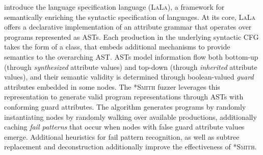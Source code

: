 \citet{kreutzer2020language} introduce the language specification language
(\textsc{LaLa}), a framework for semantically enriching the syntactic
specification of languages.
At its core, \textsc{LaLa} offers a declarative implementation of an
attribute grammar that operates over programs represented as \gls{AST}s.
Each production in the underlying syntactic \gls{CFG} takes the form of a
class, that embeds additional mechanisms to provide semantics to the
overarching \gls{AST}.
\gls{AST}s model information flow both bottom-up (through
\textit{synthesized} attribute values) and top-down (through
\textit{inherited} attribute values), and their semantic validity
is determined through boolean-valued \textit{guard} attributes embedded in
some nodes.
The \textsc{*Smith} fuzzer leverages this representation to generate valid
program representations through \gls{AST}s with conforming guard attributes.
The algorithm generates programs by randomly instantiating nodes by randomly
walking over available productions, additionally caching \textit{fail patterns}
that occur when nodes with false guard attribute values emerge.
Additional heuristics for fail pattern recognition, as well as subtree
replacement and deconstruction additionally improve the effectiveness
of \textsc{*Smith}.